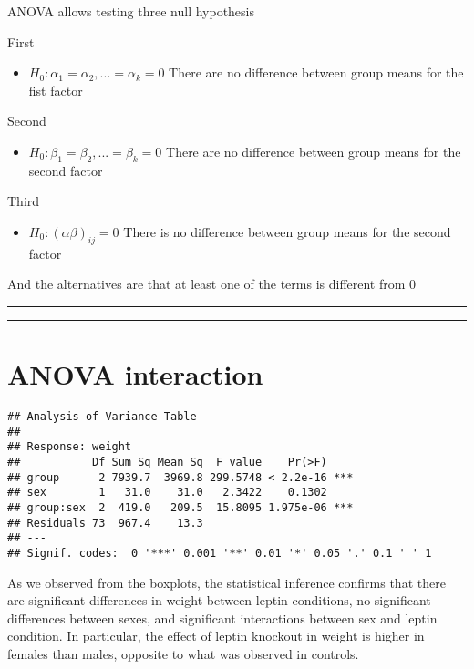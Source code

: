 \documentclass[
]{book}
\providecommand{\tightlist}{%
  \setlength{\itemsep}{0pt}\setlength{\parskip}{0pt}}
\begin{document}
ANOVA allows testing three null hypothesis

First

\begin{itemize}
\tightlist
\item
  \(H_0: \alpha_1=\alpha_2, ...=\alpha_k=0\) There are no difference between group means for the fist factor
\end{itemize}

Second

\begin{itemize}
\tightlist
\item
  \(H_0: \beta_1=\beta_2, ...=\beta_k=0\) There are no difference between group means for the second factor
\end{itemize}

Third

\begin{itemize}
\tightlist
\item
  \(H_0: (\alpha\beta)_{ij}=0\) There is no difference between group means for the second factor
\end{itemize}

And the alternatives are that at least one of the terms is different from \(0\)

\begin{center}\rule{0.5\linewidth}{0.5pt}\end{center}

\begin{center}\rule{0.5\linewidth}{0.5pt}\end{center}

\hypertarget{anova-interaction-5}{%
\section{ANOVA interaction}\label{anova-interaction-5}}

\begin{verbatim}
## Analysis of Variance Table
## 
## Response: weight
##           Df Sum Sq Mean Sq  F value    Pr(>F)    
## group      2 7939.7  3969.8 299.5748 < 2.2e-16 ***
## sex        1   31.0    31.0   2.3422    0.1302    
## group:sex  2  419.0   209.5  15.8095 1.975e-06 ***
## Residuals 73  967.4    13.3                       
## ---
## Signif. codes:  0 '***' 0.001 '**' 0.01 '*' 0.05 '.' 0.1 ' ' 1
\end{verbatim}

As we observed from the boxplots, the statistical inference confirms that there are significant differences in weight between leptin conditions, no significant differences between sexes, and significant interactions between sex and leptin condition. In particular, the effect of leptin knockout in weight is higher in females than males, opposite to what was observed in controls.
\end{document}
